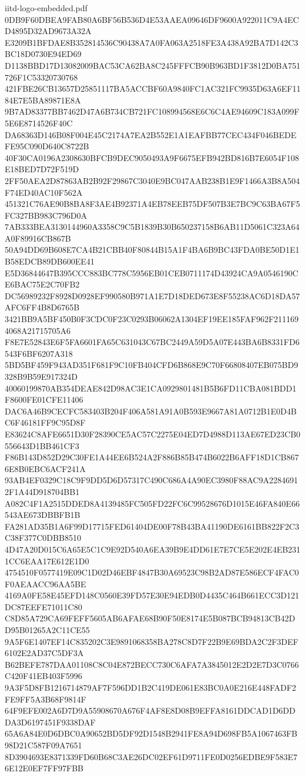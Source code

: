 \begin{filecontents*}[overwrite]{iitd-logo-embedded.pdf}
0DB9F60DBEA9FAB80A6BF56B536D4E53AAEA09646DF9600A922011C9A4ECD4895D32AD9673A32A
E3209B1BFDAE8B352814536C90438A7A0FA063A2518FE3A438A92BA7D142C3BC18D0730E94ED69
D1138BBD17D13082009BAC53CA62BA8C245FFFCB90B963BD1F3812D0BA751726F1C53320730768
421FBE26CB13657D25851117BA5ACCBF60A9840FC1AC321FC9935D63A6EF1184E7E5BA89871E8A
9B7AD83377BB7462D47A6B734CB721FC108994568E6C6C4AE94609C183A099F5E6E8714526F40C
DA68363D146B08F004E45C2174A7EA2B552E1A1EAFBB77CEC434F046BEDEFE95C090D640C8722B
40F30CA0196A2308630BFCB9DEC9050493A9F6675EFB942BD816B7E6054F108E18BED7D72F519D
2FF50AEA2D87863AB2B92F29867C3040E9BC047AAB238B1E9F1466A3B8A504F74ED40AC10F562A
451321C76AE90B8BA8F3AE4B92371A4EB78EEB75DF507B3E7BC9C63BA67F5FC327BB983C796D0A
7AB333BEA3130144960A3358C9C5B1839B30B650237158B6AB11D5061C323A64A0F89916CB867B
50A94DD69B608E7CA4B21CBB40F80844B15A1F4BA6B9BC43FDA0BE50D1E1B58EDCB89DB600EE41
E5D36844647B395CCC883BC778C5956EB01CEB0711174D43924CA9A0546190CE6BAC75E2C70FB2
DC56989232F8928D0928EF990580B971A1E7D18DED673E8F55238AC6D18DA57AFC6FF4B8D6765B
3421BB9A5BF450B0F3CDC0F23C0293B06062A1304EF19EE185FAF962F2111694068A21715705A6
F8E7E52843E6F5FA6601FA65C631043C67BC2449A59D5A07E443BA6B8331FD6543F6BF6207A318
5BD5BF459F943AD351F681F9C10FB404CFD6B868E9C70F66808407EB075BD9328B9B59E917324D
40060199870AB354DEAE842D98AC3E1CA0929801481B5B6FD11CBA081BDD1F8600FE01CFE11406
DAC6A46B9CECFC583403B204F406A581A91A0B593E9667A81A0712B1E0D4BC6F46181FF9C95D8F
E83624C8AFE6651D30F28390CE5AC57C2275E04ED7D4988D113AE67ED23CB0556643D1BB461CF3
F86B143D852D29C30FE1A44EE6B524A2F886B85B474B6022B6AFF18D1CB8676E8B0EBC6ACF241A
93AB4EF0329C18C9F9DD5D6D57317C490C686A4A90EC3980F88AC9A22846912F1A44D918704BB1
A082C4F1A2515DDED8A4139485FC505FD22FC6C99528676D1015E46FA840E66543AE673DBBFB1B
FA281AD35B1A6F99D17715FED61404DE00F78B43BA41190DE6161BB822F2C3C38F377C0DBB8510
4D47A20D015C6A65E5C1C9E92D540A6EA39B9E4DD61E7E7CE5E202E4EB2311CC6EAA17E612E1D0
4754510F0577419E09C1D02D46EBF4847B30A69523C98B2AD87E586ECF4FAC0F0AEAACC96AA5BE
4169A0FE58E45EFD148C0560E39FD57E30E94EDB0D4435C464B661ECC3D121DC87EEFE71011C80
C8D85A729CA69FEFF5605AB6AFAE68B90F50E8174E5B087BCB94813CB42DD95B01265A2C11CE55
9A5F6E1407EF14C835202C3E9891068358BA278C8D7F22B9E69BDA2C2F3DEF6102E2AD37C5DF3A
B62BEFE787DAA01108C8C04E872BECC730C6AFA7A3845012E2D2E7D3C0766C420F41EB403F5996
9A3F5D8FB1216714879AF7F596DD1B2C419DE061E83BC0A0E216E448FADF2FE9FF5A3B68F9814F
64F9EFE002A6D7D9A55908670A676F4AF8E8D08B9EFFA8161DDCAD1D6DDDA3D6197451F9338DAF
65A6A84E0D6DBC0A90652BD5DF92D1548B2941FE8A94D698FB5A1067463FB98D21C587F09A7651
8D3904693E8371339FD60B68C3AE26DC02EF61D9711FE0D0256EDBE9F583E76E12E0EF7FF97FBB

\end{filecontents*}
